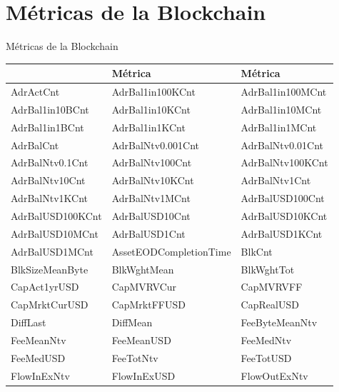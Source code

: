 \chapter[Appendix A]{Métricas de la Blockchain}{Métricas de la Blockchain}\label{appen1}
\renewcommand{\tablename}{Tabla} 


\begin{table}[ht]
	\centering
	\begin{tabular}{p{5cm} p{5cm} p{5cm}}
		\toprule
		\textbf{\centering{Métrica}} & \textbf{Métrica} & \textbf{Métrica}\\
		\midrule
		AdrActCnt  &  AdrBal1in100KCnt & AdrBal1in100MCnt\\
		
		AdrBal1in10BCnt & AdrBal1in10KCnt & AdrBal1in10MCnt \\
		
		AdrBal1in1BCnt & AdrBal1in1KCnt &
		AdrBal1in1MCnt \\ 
		
		AdrBalCnt & AdrBalNtv0.001Cnt & AdrBalNtv0.01Cnt\\
		
		AdrBalNtv0.1Cnt & AdrBalNtv100Cnt &
		AdrBalNtv100KCnt\\
		
		AdrBalNtv10Cnt & AdrBalNtv10KCnt & AdrBalNtv1Cnt \\
		
		AdrBalNtv1KCnt & AdrBalNtv1MCnt &
		AdrBalUSD100Cnt \\
		
		AdrBalUSD100KCnt &
		AdrBalUSD10Cnt & AdrBalUSD10KCnt \\
		
		AdrBalUSD10MCnt & AdrBalUSD1Cnt & 
		AdrBalUSD1KCnt \\
		
		AdrBalUSD1MCnt &
		AssetEODCompletionTime & BlkCnt \\
		
		BlkSizeMeanByte & BlkWghtMean &
		BlkWghtTot \\
		
		CapAct1yrUSD & CapMVRVCur & CapMVRVFF \\
		
		CapMrktCurUSD & CapMrktFFUSD &
		CapRealUSD \\
		
		DiffLast & DiffMean & FeeByteMeanNtv \\
		
		FeeMeanNtv & FeeMeanUSD & FeeMedNtv \\ FeeMedUSD & FeeTotNtv & FeeTotUSD \\
		FlowInExNtv & FlowInExUSD &
		FlowOutExNtv \\
		

\end{tabular}
\end{table}
